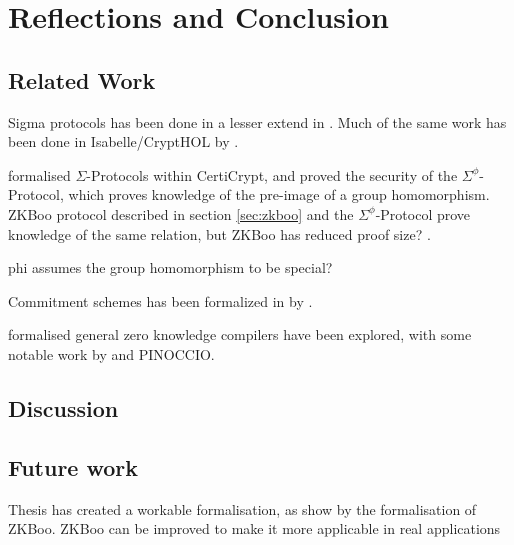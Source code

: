 \chapter{Reflections and Conclusion}
\label{sec:reflection_conclusion}

\section{Related Work}
\label{sec:related_work}

Sigma protocols has been done in a lesser extend in \easycrypt. Much of the same
work has been done in Isabelle/CryptHOL by \citeauthor{cryptoeprint:2019:1185}.

\citeauthor{certicrypt_sigma} formalised $\Sigma$-Protocols within CertiCrypt,
and proved the security of the $\Sigma^{\phi}$-Protocol, which proves knowledge
of the pre-image of a group homomorphism. ZKBoo protocol described in section
\ref{sec:zkboo} and the $\Sigma^{\phi}$-Protocol prove knowledge of the same
relation, but ZKBoo has reduced proof size? .

phi assumes the group homomorphism to be special?


Commitment schemes has been formalized in \easycrypt by
\citeauthor{DBLP:journals/corr/MetereD17}.


formalised general zero knowledge compilers have been explored, with some
notable work by \citeauthor{zkcrypt} and PINOCCIO.


\section{Discussion}
\label{sec:discussion}


\section{Future work}
\label{sec:future_work}
Thesis has created a workable formalisation, as show by the formalisation of ZKBoo. ZKBoo can be improved to make it more applicable in real applications 

